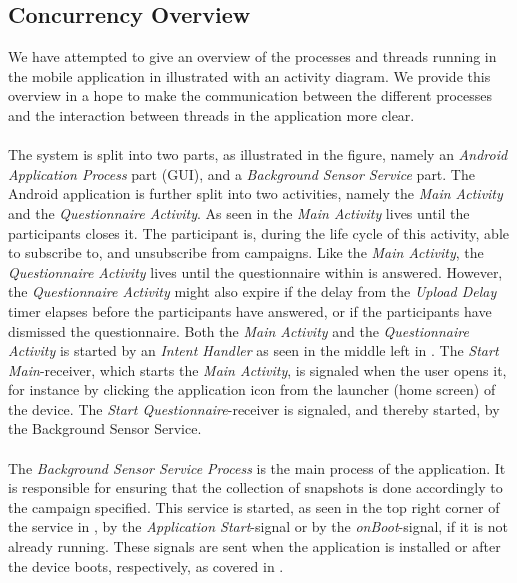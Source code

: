 \subsection{Concurrency Overview}
We have attempted to give an overview of the processes and threads running in the mobile application in  illustrated with an activity diagram. We provide this overview in a hope to make the communication between the different processes and the interaction between threads in the application more clear.
\\\\
The system is split into two parts, as illustrated in the figure, namely an \emph{Android Application Process} part (GUI), and a \emph{Background Sensor Service} part. The Android application is further split into two activities, namely the \emph{Main Activity} and the \emph{Questionnaire Activity}. As seen in  the \emph{Main Activity} lives until the participants closes it. The participant is, during the life cycle of this activity, able to subscribe to, and unsubscribe from campaigns. Like the \emph{Main Activity}, the \emph{Questionnaire Activity} lives until the questionnaire within is answered. However, the \emph{Questionnaire Activity} might also expire if the delay from the \emph{Upload Delay} timer elapses before the participants have answered, or if the participants have dismissed the questionnaire. Both the \emph{Main Activity} and the \emph{Questionnaire Activity} is started by an \emph{Intent Handler} as seen in the middle left in . The \emph{Start Main}-receiver, which starts the \emph{Main Activity}, is signaled when the user opens it, for instance by clicking the application icon from the launcher (home screen) of the device. The \emph{Start Questionnaire}-receiver is signaled, and thereby started, by the Background Sensor Service.
\\\\
The \emph{Background Sensor Service Process} is the main process of the application. It is responsible for ensuring that the collection of snapshots is done accordingly to the campaign specified. This service is started, as seen in the top right corner of the service in , by the \emph{Application Start}-signal or by the \emph{onBoot}-signal, if it is not already running. These signals are sent when the application is installed or after the device boots, respectively, as covered in . 
